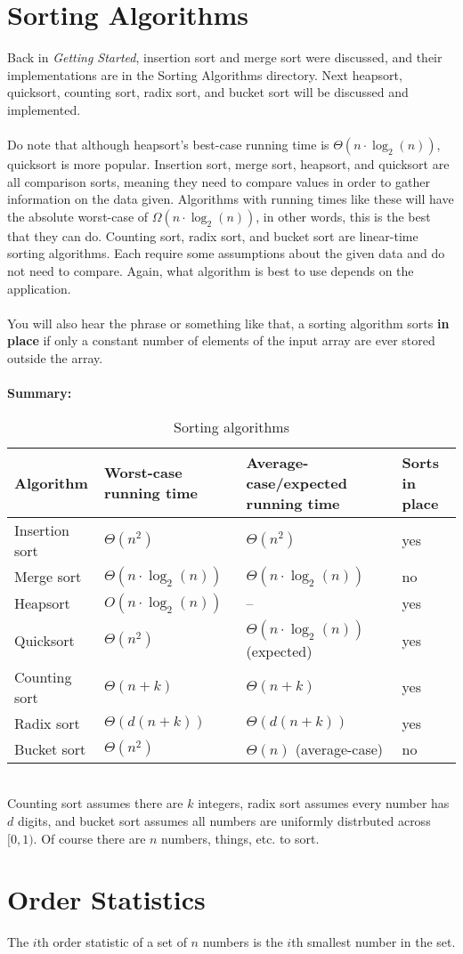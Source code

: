 \documentclass{article}
\begin{document}
\section*{Sorting Algorithms}
Back in \textit{Getting Started}, insertion sort and merge sort were discussed, and their implementations are in the Sorting Algorithms directory. Next heapsort, quicksort, counting sort, radix sort, and bucket sort will be discussed and implemented. 
\\ \\
Do note that although heapsort's best-case running time is $\Theta{(n \cdot \log_2{(n)})}$, quicksort is more popular. Insertion sort, merge sort, heapsort, and quicksort are all comparison sorts, meaning they need to compare values in order to gather information on the data given. Algorithms with running times like these will have the absolute worst-case of $\Omega{(n \cdot \log_2{(n)})}$, in other words, this is the best that they can do. Counting sort, radix sort, and bucket sort are linear-time sorting algorithms. Each require some assumptions about the given data and do not need to compare. Again, what algorithm is best to use depends on the application.
\\ \\
You will also hear the phrase  or something like that, a sorting algorithm sorts \textbf{in place} if only a constant number of elements of the input array are ever stored outside the array.
\\ \\
\textbf{Summary:}
\begin{table}[h!]
\caption{Sorting algorithms}
\begin{tabular}{ |p{3cm}||p{3cm}|p{3cm}|p{3cm}|  }
 \hline
 \hline
 Algorithm & Worst-case running time & Average-case/expected running time & Sorts in place\\
 \hline
 Insertion sort	& $\Theta{(n^{2})}$ & $\Theta{(n^{2})}$ & yes\\
 Merge sort     & $\Theta{(n \cdot \log_2{(n)})}$ & $\Theta{(n \cdot \log_2{(n)})}$ & no\\
 Heapsort       & $O{(n \cdot \log_2{(n)})}$ & -- & yes\\
 Quicksort      & $\Theta{(n^{2})}$ & $\Theta{(n \cdot \log_2{(n)})}$ (expected) & yes\\
 Counting sort  & $\Theta{(n + k)}$ & $\Theta{(n + k)}$ & yes\\
 Radix sort     & $\Theta{(d(n+k))}$ & $\Theta{(d(n+k))}$ & yes\\
 Bucket sort    & $\Theta{(n^{2})}$ & $\Theta{(n)}$ (average-case)& no\\
  \hline
\end{tabular}
\end{table}
\\
Counting sort assumes there are $k$ integers, radix sort assumes every number has $d$ digits, and bucket sort assumes all numbers are uniformly distrbuted across $[0, 1)$. Of course there are $n$ numbers, things, etc. to sort.
 
\newpage

\section*{Order Statistics}
The $i$th order statistic of a set of $n$ numbers is the $i$th smallest number in the set.
\end{document}

